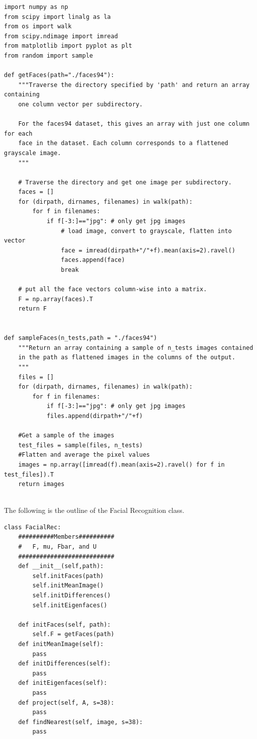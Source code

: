 \begin{lstlisting}
import numpy as np
from scipy import linalg as la
from os import walk
from scipy.ndimage import imread
from matplotlib import pyplot as plt
from random import sample

def getFaces(path="./faces94"):
    """Traverse the directory specified by 'path' and return an array containing
    one column vector per subdirectory.
    
    For the faces94 dataset, this gives an array with just one column for each
    face in the dataset. Each column corresponds to a flattened grayscale image.
    """
    
    # Traverse the directory and get one image per subdirectory.
    faces = []
    for (dirpath, dirnames, filenames) in walk(path):
        for f in filenames:
            if f[-3:]=="jpg": # only get jpg images
                # load image, convert to grayscale, flatten into vector
                face = imread(dirpath+"/"+f).mean(axis=2).ravel() 
                faces.append(face)
                break
        
    # put all the face vectors column-wise into a matrix.
    F = np.array(faces).T
    return F


def sampleFaces(n_tests,path = "./faces94")
    """Return an array containing a sample of n_tests images contained 
    in the path as flattened images in the columns of the output.
    """
    files = []
    for (dirpath, dirnames, filenames) in walk(path):
        for f in filenames:
            if f[-3:]=="jpg": # only get jpg images
            files.append(dirpath+"/"+f)
            
    #Get a sample of the images
    test_files = sample(files, n_tests)
    #Flatten and average the pixel values
    images = np.array([imread(f).mean(axis=2).ravel() for f in test_files]).T
    return images
    
\end{lstlisting}

The following is the outline of the Facial Recognition class.

\begin{lstlisting}
class FacialRec:
    ##########Members##########
    #   F, mu, Fbar, and U 
    ###########################
    def __init__(self,path):
        self.initFaces(path)
        self.initMeanImage()
        self.initDifferences()
        self.initEigenfaces()

    def initFaces(self, path):
        self.F = getFaces(path)
    def initMeanImage(self):
        pass
    def initDifferences(self):
        pass
    def initEigenfaces(self):
        pass
    def project(self, A, s=38):
        pass
    def findNearest(self, image, s=38):
        pass
\end{lstlisting}
